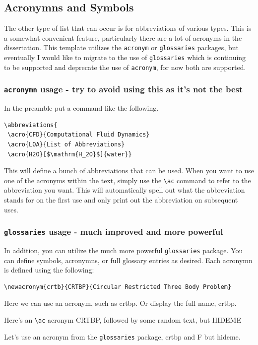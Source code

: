 \subsection{Acronymns and Symbols}\label{ssec:acronymns}
The other type of list that can occur is for abbreviations of various types.  
This is a somewhat convenient feature, particularly there are a lot of acronyms in the dissertation.  
This template utilizes the \texttt{acronym} or \texttt{glossaries} packages, but eventually I would like to migrate to the use of \texttt{glossaries} which is continuing to be supported and deprecate the use of \texttt{acronym}, for now both are supported. 

\subsubsection{\texttt{acronymn} usage - try to avoid using this as it's not the best}
In the preamble put a command like the following.
\begin{verbatim}
\abbreviations{
 \acro{CFD}{Computational Fluid Dynamics}
 \acro{LOA}{List of Abbreviations}
 \acro{H2O}[$\mathrm{H_2O}$]{water}}
\end{verbatim}
This will define a bunch of abbreviations that can be used.  
When you want to use one of the acronyms within the text, simply use the \verb|\ac| command to refer to the abbreviation you want.
This will automatically spell out what the abbreviation stands for on the first use and only print out the abbreviation on subsequent uses.  

\subsubsection{\texttt{glossaries} usage - much improved and more powerful}
In addition, you can utilize the much more powerful \texttt{glossaries} package.
You can define symbols, acronymns, or full glossary entries as desired.
Each acronymn is defined using the following:
\begin{verbatim}
\newacronym{crtb}{CRTBP}{Circular Restricted Three Body Problem}
\end{verbatim}
Here we can use an acronym, such as \gls{crtbp}.
Or display the full name, \gls{crtbp}.

Here's an \verb|\ac| acronym \ac{CRTBP}, followed by some random text, but \ac{HIDEME}


Let's use an acronym from the \texttt{glossaries} package, \acrfull{crtbp} and \gls{F} but \acrfull{hideme}.


